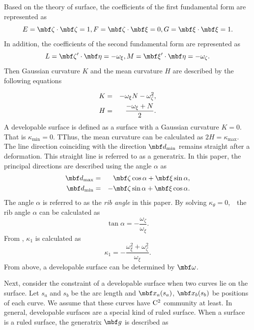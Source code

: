 \documentclass[E]{scitrans}
\begin{document}
Based on the theory of surface, the coefficients of the first fundamental form are represented as
\begin{equation}
E = \zetavec \cdot \zetavec = 1, F = \zetavec \cdot \xivec = 0, G = \xivec \cdot \xivec = 1.
\end{equation}
In addition, the coefficients of the second fundamental form are represented as
\begin{equation}
L = \zetavec' \cdot \etavec = -\omega_{\xi}, M = \xivec' \cdot \etavec = -\omega_{\zeta}.
\end{equation}
Then Gaussian curvature $K$ and the mean curvature $H$ are described by the following equations

\begin{eqnarray}
\label{eq:GC_expressed_omega}
K &=& -\omega_{\xi} N - \omega_{\zeta}^2, \\
H &=& {\displaystyle{\frac{-\omega_{\xi}+N}{2}}}.
\end{eqnarray}
A developable surface is defined as a surface with a Gaussian curvature $K = 0$. That is $\kappa_{\min}=0$. TThus, the mean curvature can be calculated as $2H=\kappa_{\max}$. The line direction coinciding with the direction $\mbold{d}_{\min}$ remains straight after a deformation. This straight line is referred to as a generatrix. In this paper, the principal directions are described using the angle $ \alpha $ as 
\begin{eqnarray}\label{eq:d1d2_eq}
\mbold{d}_{\max} &=& \zetavec \cos \alpha + \xivec \sin \alpha, \nonumber \\ 
\mbold{d}_{\min} &=& -\zetavec \sin \alpha + \xivec \cos \alpha.
\end{eqnarray}
The angle $ \alpha $ is referred to as the \textit{rib angle} in this paper.
By solving $ \kappa_{\theta} = 0 $,　the rib angle $ \alpha $ can be calculated as
\begin{equation}\label{eq:alpha_eq}
\tan \alpha = -\frac{\omega_{\zeta}}{\omega_{\xi}}.
\end{equation}
From , $\kappa_1$ is calculated as 
\begin{equation}\label{eq:kappa1_eq}
\kappa_1 = -\frac{\omega_{\xi}^2 + \omega_{\zeta}^2}{\omega_{\xi}}.
\end{equation}
From above, a developable surface can be determined by $\mbold{\omega}$.

Next, consider the constraint of a developable surface when two curves lie on the surface. Let $s_a$ and $s_b$ be the arc length and $\mbold{x}_a(s_a)$, $\mbold{x}_b(s_b)$ be positions of each curve. We assume that these curves have ${\rm C}^2$ community at least. In general, developable surfaces are a special kind of ruled surface. When a surface is a ruled surface, the generatrix $ \mbold{g} $ is described as
\end{document}
